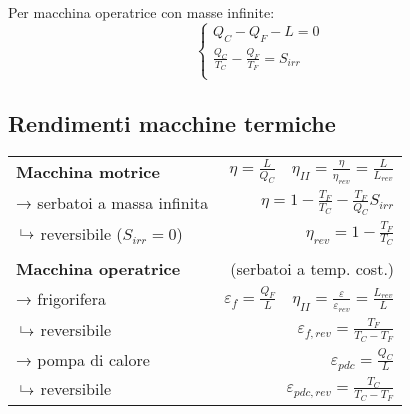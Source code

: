 Per macchina operatrice con masse infinite:
\[
    \begin{cases}
        Q_C - Q_F - L = 0 \\
        \frac{Q_C}{T_C} - \frac{Q_F}{T_F} = S_{irr} \\
    \end{cases}
\]

\subsection{Rendimenti macchine termiche}
{\renewcommand{\arraystretch}{1.5}
\begin{tabular}{p{3.5cm}r}
\textbf{Macchina motrice} & $\eta = \frac{L}{Q_C} \quad \eta_{II} = \frac{\eta}{\eta_{rev}} = \frac{L}{L_{rev}} $ \\
→ serbatoi a massa infinita & $\eta = 1 - \frac{T_F}{T_C} - \frac{T_F}{Q_C}S_{irr}$ \\
\phantom{→}$\put(3,2){\line(0,1){5}}\to$ reversibile ($S_{irr} = 0$) & $\eta_{rev} = 1 - \frac{T_F}{T_C}$ \\
\\
\textbf{Macchina operatrice} & (serbatoi a temp. cost.) \\
→ frigorifera & $\varepsilon_f = \frac{Q_F}{L} \quad \eta_{II} = \frac{\varepsilon}{\varepsilon_{rev}} = \frac{L_{rev}}{L}$ \\
\phantom{→}$\put(3,2){\line(0,1){5}}\to$ reversibile & $\varepsilon_{f,rev} = \frac{T_F}{T_C - T_F}$ \\
→ pompa di calore & $\varepsilon_{pdc} = \frac{Q_C}{L}$ \\
\phantom{→}$\put(3,2){\line(0,1){5}}\to$ reversibile & $\varepsilon_{pdc,rev} = \frac{T_C}{T_C - T_F}$ \\
\end{tabular}
}
